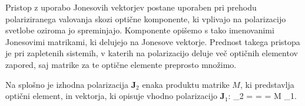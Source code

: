Pristop z uporabo Jonesovih vektorjev postane uporaben pri prehodu
polariziranega valovanja skozi optične komponente, ki vplivajo na 
polarizacijo svetlobe oziroma jo spreminjajo. Komponente opišemo s tako
imenovanimi Jonesovimi matrikami, ki delujejo na Jonesove vektorje. 
Prednost takega pristopa je pri zapletenih sistemih, v katerih
na polarizacijo deluje več optičnih elementov zapored, saj
matrike za te optične elemente preprosto množimo.

Na splošno je izhodna polarizacija $\mathbf{J}_2$ enaka produktu
matrike $M$, ki predstavlja optični element,
in vektorja, ki opisuje vhodno polarizacijo $\mathbf{J}_1$:
\beq
{}_2 = \left[\begin{array}{c}
J_{2x}\\
J_{2y}\\
\end{array}\right] = 
\left[\begin{array}{cc}
M_{11}& M_{12}\\
M_{21}& M_{22}\\
\end{array}\right]\cdot
\left[\begin{array}{c}
J_{1x}\\
J_{1y}\\
\end{array}\right] = M \cdot {}_1.
\label{eq:03_48}
\eeq

